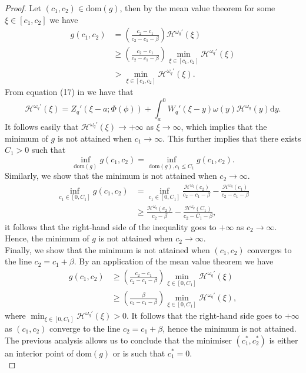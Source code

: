 \documentclass[10pt,a4paper]{amsart}
\newcommand{\diff}{\mathrm{d}}
\newcommand{\cH}{\mathcal{H}}
\newcommand{\homega}{\omega_q}
\newcommand{\PAR}[1]{{{\left(#1\right)}}} %
\renewcommand{\leq}{\leqslant}
\renewcommand{\geq}{\geqslant}
\begin{document}
\begin{proof}
	Let $(c_1,c_2) \in \text{dom}(g)$, then by the mean value theorem for some $\xi \in [c_1,c_2]$ we have
	\begin{align*}
	g(c_1,c_2) &= \PAR{\frac{c_2-c_1}{c_2-c_1-\beta}} \cH^{\homega\prime}(\xi)\\
	&\geq \PAR{\frac{c_2-c_1}{c_2-c_1-\beta}} \min_{\xi \in [c_1,c_2]} \cH^{\homega\prime}(\xi)\\
	& > \min_{\xi \in [c_1,c_2]} \cH^{\homega\prime}(\xi).
	\end{align*}
	From equation (17) in \cite{mata-renaud_2024}we have that
	\[
	\cH^{\homega\prime}(\xi) = Z_q'(\xi-a;\Phi(\phi)) + \int_a^0 W_q'(\xi-y)\omega(y) \cH^{\homega}(y) \diff y.
	\] 
	It follows easily that $\cH^{\homega\prime}(\xi) \to +\infty$ as $\xi \to \infty$, which implies that the minimum of $g$ is not attained when $c_1 \to \infty$. This further implies that there exists $C_1 > 0$ such that
	\[
	\inf_{\text{dom}(g)} g(c_1,c_2) = \inf_{\text{dom}(g), c_1\leq C_1}g(c_1,c_2).
	\]
	Similarly, we show that the minimum is not attained when $c_2 \to \infty$.
	\begin{align*}
		\inf_{c_1 \in [0,C_1]}g(c_1,c_2) &= \inf_{c_1 \in [0,C_1]} \frac{\cH^{\homega}(c_2)}{c_2-c_1-\beta} - \frac{\cH^{\homega}(c_1)}{c_2-c_1-\beta} \\
		& \geq \frac{\cH^{\homega}(c_2)}{c_2-\beta} - \frac{\cH^{\homega}(C_1)}{c_2-C_1-\beta},
	\end{align*}
	it follows that the right-hand side of the inequality goes to $+\infty$ as $c_2 \to \infty$. Hence, the minimum of $g$ is not attained when $c_2 \to \infty$.\\
	Finally, we show that the minimum is not attained when $(c_1,c_2)$ converges to the line $c_2 = c_1 + \beta$. By an application of the mean value theorem we have
	\begin{align*}
		g(c_1,c_2) &\geq \PAR{\frac{c_2-c_1}{c_2-c_1-\beta}} \min_{\xi \in [0,C_1]}\cH^{\homega\prime}(\xi)\\
		&\geq \PAR{\frac{\beta}{c_2-c_1-\beta}} \min_{\xi \in [0,C_1]}\cH^{\homega\prime}(\xi),
	\end{align*}
	where $\min_{\xi \in [0,C_1]}\cH^{\homega\prime}(\xi)>0$. It follows that the right-hand side goes to $+\infty$ as $(c_1,c_2)$ converge to the line $c_2 = c_1 + \beta$, hence the minimum is not attained.\\
	The previous analysis allows us to conclude that the minimiser $(c_1^\ast,c_2^\ast)$ is either an interior point of $\text{dom}(g)$ or is such that $c_1^\ast = 0$.\\

\end{proof}
\end{document}
